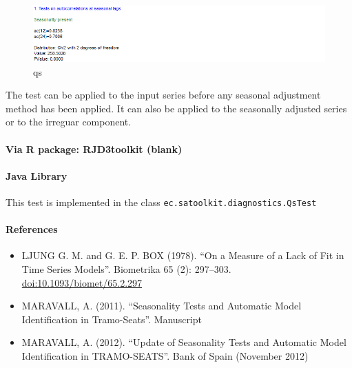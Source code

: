 \documentclass[
  letterpaper,
  DIV=11,
  numbers=noendperiod]{scrreprt}
\let\oldparagraph\paragraph
\renewcommand{\paragraph}[1]{\oldparagraph{#1}\mbox{}}
\providecommand{\tightlist}{%
  \setlength{\itemsep}{0pt}\setlength{\parskip}{0pt}}\usepackage{longtable,booktabs,array}
\begin{document}
\begin{figure}

{\centering \includegraphics{./All_images/qs.png}

}

\caption{qs}

\end{figure}

The test can be applied to the input series before any seasonal
adjustment method has been applied. It can also be applied to the
seasonally adjusted series or to the irreguar component.

\hypertarget{via-r-package-rjd3toolkit-blank}{%
\paragraph{Via R package: RJD3toolkit
(blank)}\label{via-r-package-rjd3toolkit-blank}}

\hypertarget{java-library}{%
\paragraph{Java Library}\label{java-library}}

This test is implemented in the class
\texttt{ec.satoolkit.diagnostics.QsTest}

\hypertarget{references}{%
\paragraph{References}\label{references}}

\begin{itemize}
\tightlist
\item
  LJUNG G. M. and G. E. P. BOX (1978). ``On a Measure of a Lack of Fit
  in Time Series Models''. Biometrika 65 (2): 297--303.
  \url{doi:10.1093/biomet/65.2.297}
\item
  MARAVALL, A. (2011). ``Seasonality Tests and Automatic Model
  Identification in Tramo-Seats''. Manuscript
\item
  MARAVALL, A. (2012). ``Update of Seasonality Tests and Automatic Model
  Identification in TRAMO-SEATS''. Bank of Spain (November 2012)
\end{itemize}
\end{document}
